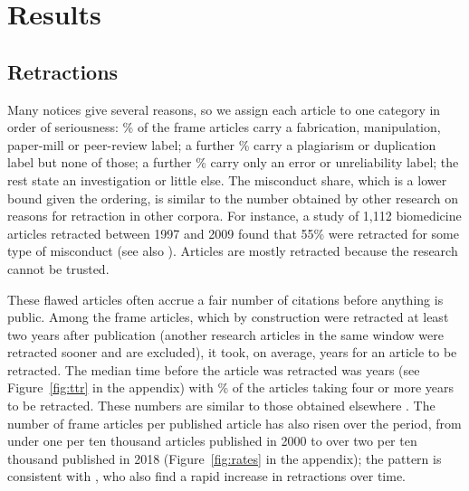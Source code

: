 \documentclass[11pt,letterpaper]{article}
\begin{document}
\section{Results}
\subsection{Retractions}
Many notices give several reasons, so we assign each article to one category in order of seriousness: \MisconductShare\% of the frame articles carry a fabrication, manipulation, paper-mill or peer-review label; a further \DuplicationShare\% carry a plagiarism or duplication label but none of those; a further \ErrorShare\% carry only an error or unreliability label; the rest state an investigation or little else. The misconduct share, which is a lower bound given the ordering, is similar to the number obtained by other research on reasons for retraction in other corpora. For instance, a study of 1,112 biomedicine articles retracted between 1997 and 2009 found that 55\% were retracted for some type of misconduct \citep{budd2011retracted} (see also \citet{steen2011retractions, fang2012misconduct}). Articles are mostly retracted because the research cannot be trusted.

These flawed articles often accrue a fair number of citations before anything is public. Among the frame articles, which by construction were retracted at least two years after publication (another \ShortLagExcluded{} research articles in the same window were retracted sooner and are excluded), it took, on average, \MeanLag{} years for an article to be retracted. The median time before the article was retracted was \MedianLag{} years (see Figure~\ref{fig:ttr} in the appendix) with \LagFourPlusPercent\% of the articles taking four or more years to be retracted. These numbers are similar to those obtained elsewhere \citep[e.g.,][]{steen2013has}. The number of frame articles per published article has also risen over the period, from under one per ten thousand articles published in 2000 to over two per ten thousand published in 2018 (Figure~\ref{fig:rates} in the appendix); the pattern is consistent with \citet{steen2013has}, who also find a rapid increase in retractions over time.
\end{document}
